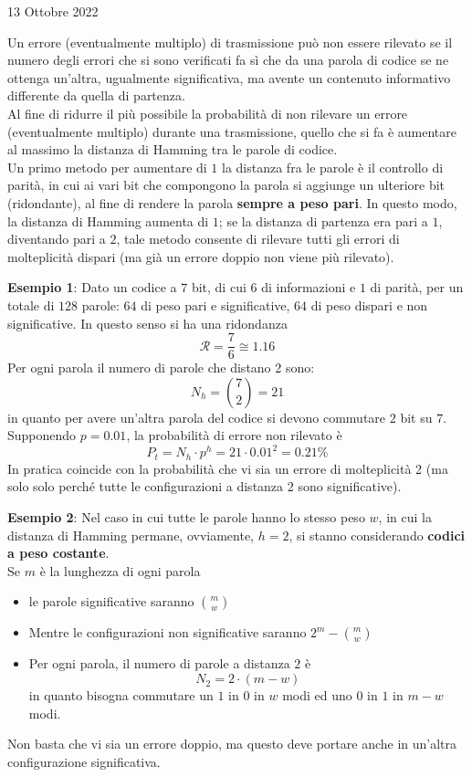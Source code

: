 \documentclass[a4paper]{extarticle}
\begin{document}
\newpage
\begin{center}
    13 Ottobre 2022
\end{center}
Un errore (eventualmente multiplo) di trasmissione può non essere rilevato se il numero degli errori che si sono verificati fa sì che da una parola di codice se ne ottenga un'altra, ugualmente significativa, ma avente un contenuto informativo differente da quella di partenza.\\
Al fine di ridurre il più possibile la probabilità di non rilevare un errore (eventualmente multiplo) durante una trasmissione, quello che si fa è aumentare al massimo la distanza di Hamming tra le parole di codice.\\
Un primo metodo per aumentare di $1$ la distanza fra le parole è il controllo di parità, in cui ai vari bit che compongono la parola si aggiunge un ulteriore bit (ridondante), al fine di rendere la parola \textbf{sempre a peso pari}. In questo modo, la distanza di Hamming aumenta di $1$; se la distanza di partenza era pari a $1$, diventando pari a $2$, tale metodo consente di rilevare tutti gli errori di molteplicità dispari (ma già un errore doppio non viene più rilevato).

\vspace{1em}
\noindent
\textbf{Esempio 1}: Dato un codice a $7$ bit, di cui $6$ di informazioni e $1$ di parità, per un totale di $128$ parole: $64$ di peso pari e significative, $64$ di peso dispari e non significative. In questo senso si ha una ridondanza 
\[\mathcal{R}=\frac{7}{6} \cong 1.16\]
Per ogni parola il numero di parole che distano 2 sono:
\[N_h = \binom{7}{2} = 21\]
in quanto per avere un'altra parola del codice si devono commutare $2$ bit su $7$.\\
Supponendo $p=0.01$, la probabilità di errore non rilevato è
\[P_t = N_h \cdot p^h = 21 \cdot 0.01^2=0.21\%\]
In pratica coincide con la probabilità che vi sia un errore di molteplicità 2 (ma solo solo perché tutte le configurazioni a distanza 2 sono significative).

\vspace{1em}
\noindent
\textbf{Esempio 2}: Nel caso in cui tutte le parole hanno lo stesso peso $w$, in cui la distanza di Hamming permane, ovviamente, $h=2$, si stanno considerando \textbf{codici a peso costante}.\\
Se $m$ è la lunghezza di ogni parola
\begin{itemize}
    \item le parole significative saranno $\displaystyle{\binom{m}{w}}$
    \item Mentre le configurazioni non significative saranno $\displaystyle{2^m-\binom{m}{w}}$
    \item Per ogni parola, il numero di parole a distanza $2$ è
    \[N_2=2 \cdot (m-w)\]
    in quanto bisogna commutare un $1$ in $0$ in $w$ modi ed uno $0$ in $1$ in $m-w$ modi.
\end{itemize}
Non basta che vi sia un errore doppio, ma questo deve portare anche in un'altra configurazione significativa.
\end{document}
